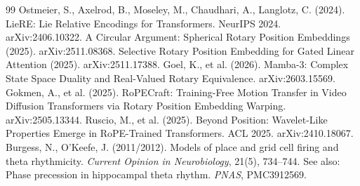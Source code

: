 \documentclass[10pt, twocolumn, a4paper]{article}
\begin{document}
\begin{thebibliography}{99}
 Ostmeier, S., Axelrod, B., Moseley, M., Chaudhari, A., Langlotz, C. (2024). LieRE: Lie Relative Encodings for Transformers. NeurIPS 2024. arXiv:2406.10322.
 A Circular Argument: Spherical Rotary Position Embeddings (2025). arXiv:2511.08368.
 Selective Rotary Position Embedding for Gated Linear Attention (2025). arXiv:2511.17388.
 Goel, K., et al. (2026). Mamba-3: Complex State Space Duality and Real-Valued Rotary Equivalence. arXiv:2603.15569.
 Gokmen, A., et al. (2025). RoPECraft: Training-Free Motion Transfer in Video Diffusion Transformers via Rotary Position Embedding Warping. arXiv:2505.13344.
 Ruscio, M., et al. (2025). Beyond Position: Wavelet-Like Properties Emerge in RoPE-Trained Transformers. ACL 2025. arXiv:2410.18067.
 Burgess, N., O'Keefe, J. (2011/2012). Models of place and grid cell firing and theta rhythmicity. \emph{Current Opinion in Neurobiology}, 21(5), 734--744. See also: Phase precession in hippocampal theta rhythm. \emph{PNAS}, PMC3912569.
\end{thebibliography}
\end{document}
